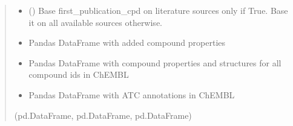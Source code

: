 \documentclass[letterpaper,10pt,english]{sphinxmanual}
\begin{document}
\begin{fulllineitems}
\begin{quote}
\begin{description}
\begin{itemize}
\item {} 
\sphinxAtStartPar
{} () \textendash{} Base first\_publication\_cpd on literature sources only if True. Base it on all available sources otherwise.

\end{itemize}

\sphinxAtStartPar
\begin{itemize}
\item {} 
\sphinxAtStartPar
Pandas DataFrame with added compound properties 

\item {} 
\sphinxAtStartPar
Pandas DataFrame with compound properties and structures for all compound ids in ChEMBL 

\item {} 
\sphinxAtStartPar
Pandas DataFrame with ATC annotations in ChEMBL

\end{itemize}


\sphinxAtStartPar
(pd.DataFrame, pd.DataFrame, pd.DataFrame)

\end{description}\end{quote}

\end{fulllineitems}

\end{document}
